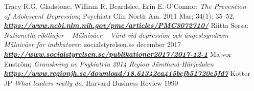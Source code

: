 \documentclass[12pt,a4paper,oneside]{article}
\begin{document}
\begin{thebibliography}{11}
Tracy R.G. Gladstone, William R. Beardslee, Erin E. O'Connor; \emph{The Prevention of Adolescent Depression}; Psychiatr Clin North Am. 2011 Mar; 34(1): 35--52. \\\textbf{\emph{\href{https://www.ncbi.nlm.nih.gov/pmc/articles/PMC3072710/}{\url{https://www.ncbi.nlm.nih.gov/pmc/articles/PMC3072710/}}}}
Riitta Sorsa; \emph{Nationella riktlinjer -- M\r{a}lniv\r{a}er -- V\r{a}rd vid depression och \r{a}ngestsyndrom -- M\r{a}lniv\r{a}er f{\"o}r indikatorer}; socialstyrelsen.se december 2017\\\textbf{\emph{\href{http://www.socialstyrelsen.se/publikationer2017/2017-12-1}{\url{http://www.socialstyrelsen.se/publikationer2017/2017-12-1}}}}
Majvor Enstr{\"o}m; \emph{Granskning av Psykiatrin 2014 Region J{\"a}mtland-H{\"a}rjedalen}\\\textbf{\emph{\href{https://www.regionjh.se/download/18.61342ea415bcfb51720c5fd7}{\url{https://www.regionjh.se/download/18.61342ea415bcfb51720c5fd7}}}}
Kotter JP \emph{What leaders really do.} Harvard Business Review 1990


\end{thebibliography}
\end{document}
